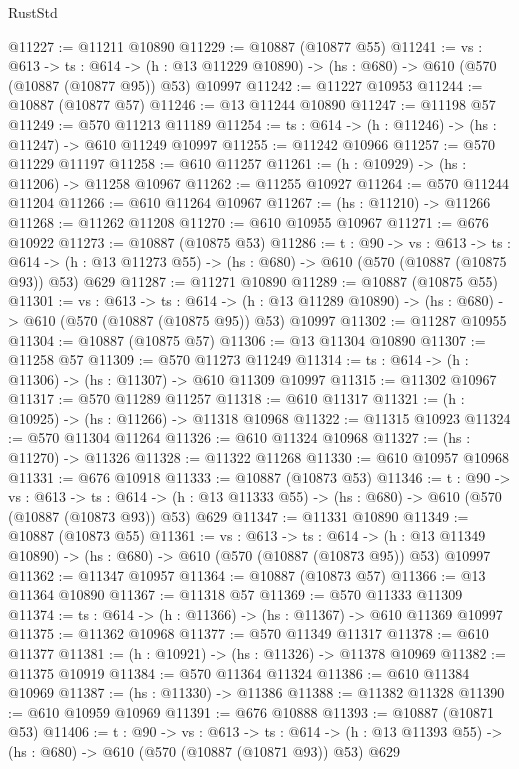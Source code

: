 \begin{lexlean}{RustStd}
\begin{coremodule}
@11227 := @11211 @10890
@11229 := @10887 (@10877 @55)
@11241 := {vs : @613} ->
  {ts : @614} ->
  (h : @13 @11229 @10890) -> (hs : @680) -> @610 (@570 (@10887 (@10877 @95)) @53) @10997
@11242 := @11227 @10953
@11244 := @10887 (@10877 @57)
@11246 := @13 @11244 @10890
@11247 := @11198 @57
@11249 := @570 @11213 @11189
@11254 := {ts : @614} -> (h : @11246) -> (hs : @11247) -> @610 @11249 @10997
@11255 := @11242 @10966
@11257 := @570 @11229 @11197
@11258 := @610 @11257
@11261 := (h : @10929) -> (hs : @11206) -> @11258 @10967
@11262 := @11255 @10927
@11264 := @570 @11244 @11204
@11266 := @610 @11264 @10967
@11267 := (hs : @11210) -> @11266
@11268 := @11262 @11208
@11270 := @610 @10955 @10967
@11271 := @676 @10922
@11273 := @10887 (@10875 @53)
@11286 := {t : @90} ->
  {vs : @613} ->
  {ts : @614} -> (h : @13 @11273 @55) -> (hs : @680) -> @610 (@570 (@10887 (@10875 @93)) @53) @629
@11287 := @11271 @10890
@11289 := @10887 (@10875 @55)
@11301 := {vs : @613} ->
  {ts : @614} ->
  (h : @13 @11289 @10890) -> (hs : @680) -> @610 (@570 (@10887 (@10875 @95)) @53) @10997
@11302 := @11287 @10955
@11304 := @10887 (@10875 @57)
@11306 := @13 @11304 @10890
@11307 := @11258 @57
@11309 := @570 @11273 @11249
@11314 := {ts : @614} -> (h : @11306) -> (hs : @11307) -> @610 @11309 @10997
@11315 := @11302 @10967
@11317 := @570 @11289 @11257
@11318 := @610 @11317
@11321 := (h : @10925) -> (hs : @11266) -> @11318 @10968
@11322 := @11315 @10923
@11324 := @570 @11304 @11264
@11326 := @610 @11324 @10968
@11327 := (hs : @11270) -> @11326
@11328 := @11322 @11268
@11330 := @610 @10957 @10968
@11331 := @676 @10918
@11333 := @10887 (@10873 @53)
@11346 := {t : @90} ->
  {vs : @613} ->
  {ts : @614} -> (h : @13 @11333 @55) -> (hs : @680) -> @610 (@570 (@10887 (@10873 @93)) @53) @629
@11347 := @11331 @10890
@11349 := @10887 (@10873 @55)
@11361 := {vs : @613} ->
  {ts : @614} ->
  (h : @13 @11349 @10890) -> (hs : @680) -> @610 (@570 (@10887 (@10873 @95)) @53) @10997
@11362 := @11347 @10957
@11364 := @10887 (@10873 @57)
@11366 := @13 @11364 @10890
@11367 := @11318 @57
@11369 := @570 @11333 @11309
@11374 := {ts : @614} -> (h : @11366) -> (hs : @11367) -> @610 @11369 @10997
@11375 := @11362 @10968
@11377 := @570 @11349 @11317
@11378 := @610 @11377
@11381 := (h : @10921) -> (hs : @11326) -> @11378 @10969
@11382 := @11375 @10919
@11384 := @570 @11364 @11324
@11386 := @610 @11384 @10969
@11387 := (hs : @11330) -> @11386
@11388 := @11382 @11328
@11390 := @610 @10959 @10969
@11391 := @676 @10888
@11393 := @10887 (@10871 @53)
@11406 := {t : @90} ->
  {vs : @613} ->
  {ts : @614} -> (h : @13 @11393 @55) -> (hs : @680) -> @610 (@570 (@10887 (@10871 @93)) @53) @629

\end{coremodule}
\end{lexlean}
